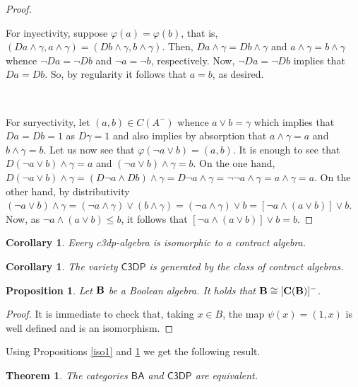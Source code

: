 \documentclass[a4paper,11pt]{article}
\newtheorem{cor}[theorem]{Corollary}
\newtheorem{prop}[theorem]{Proposition}
\newtheorem{thm}[theorem]{Theorem}
\theoremstyle{definition}
\newcommand{\hdz}{\mathsf{C3DP}}
\newcommand{\bool}{\mathsf{BA}}
\begin{document}
\begin{proof}
\

For inyectivity, suppose  $\varphi(a) = \varphi(b)$, that is, $(Da \wedge \gamma, a \wedge \gamma) = (Db \wedge \gamma, b \wedge \gamma)$. 
Then, $Da \wedge \gamma = Db \wedge \gamma$ and $a \wedge \gamma = b \wedge \gamma$ whence  $\neg Da = \neg Db$ and $\neg a = \neg b$, respectively.
Now, $\neg Da = \neg Db$ implies that $Da = Db$. 
So, by regularity it follows that $a = b$, as desired.

\

For suryectivity, let $(a,b) \in C(A^-)$  whence $a \vee b = \gamma$ which implies that 
$Da = Db = 1$ as $D\gamma = 1$ and also implies by absorption that $a \wedge \gamma = a$ and $b \wedge \gamma = b$.
Let us now see that $\varphi (\neg a \vee b) = (a,b)$. 
It is enough to see that $D(\neg a \vee b) \wedge \gamma = a$ and $(\neg a \vee b) \wedge \gamma = b$.
On the one hand, $D(\neg a \vee b) \wedge \gamma = (D\neg a \wedge Db) \wedge \gamma = D\neg a \wedge \gamma = \neg \neg a \wedge \gamma = a \wedge \gamma = a$. 
On the other hand, by distributivity  $(\neg a \vee b) \wedge \gamma = (\neg a \wedge \gamma) \vee (b \wedge \gamma) = (\neg a \wedge \gamma) \vee b = [\neg a \wedge (a \vee b)] \vee b$. 
Now,  as $\neg a \wedge (a \vee b) \leq b$, it follows that  $[\neg a \wedge (a \vee b)] \vee b= b$.
\end{proof}

\begin{cor} \label{cor1}
Every c3dp-algebra is isomorphic to a contract algebra.
\end{cor}

\begin{cor} \label{cor2}
The variety $\hdz$ is generated by the class of contract algebras.
\end{cor}

\begin{prop} \label{iso2}
Let ${\bf{B}}$ be a Boolean algebra. 
It holds that ${\bf{B}} \cong {\bf{[C(B)]^-}}$.
\end{prop}

\begin{proof}
It is immediate to check that, taking $x \in B$, the map $\psi(x) = (1,x)$ is well defined and is an isomorphism.
\end{proof}

Using Propositions \ref{iso1} and \ref{iso2} we get the following result.

\begin{thm} \label{cateq}
The categories $\bool$ and $\hdz$ are equivalent.
\end{thm}
\end{document}
